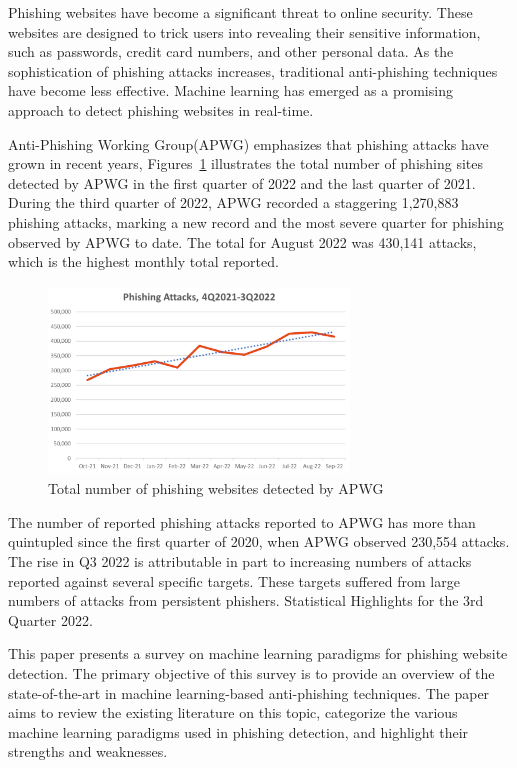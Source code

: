 \documentclass[final]{cvpr}
\begin{document}
Phishing websites have become a significant threat to online security. These websites are designed to trick users into revealing their sensitive information, such as passwords, credit card numbers, and other personal data. As the sophistication of phishing attacks increases, traditional anti-phishing techniques have become less effective. Machine learning has emerged as a promising approach to detect phishing websites in real-time.

Anti-Phishing Working Group(APWG) emphasizes that phishing attacks
have grown in recent years, Figures~\ref{fig:apwg-report} illustrates the total
number of phishing sites detected by APWG in the first quarter
of 2022 and the last quarter of 2021. During the third quarter of 2022, APWG recorded a staggering 1,270,883 phishing attacks, marking a new record and the most severe quarter for phishing observed by APWG to date. 
The total for August 2022 was 430,141 attacks,
which is the highest monthly total reported. 

\hspace*{-0.2in}
\begin{figure}[h]
   \centering
   \includegraphics[width=8cm, height=5cm]{APWG-phishing-detection-report.png}
   \caption{Total number of phishing websites detected by APWG}
   \label{fig:apwg-report}
\end{figure}

The number of reported phishing attacks reported to APWG
has more than quintupled since the first quarter of 2020, when APWG observed 230,554 attacks.
The rise in Q3 2022 is attributable in part to increasing numbers of attacks reported against several
specific targets. These targets suffered from large numbers of attacks from persistent phishers.
Statistical Highlights for the 3rd Quarter 2022.



This paper presents a survey on machine learning paradigms for phishing website detection. The primary objective of this survey is to provide an overview of the state-of-the-art in machine learning-based anti-phishing techniques. The paper aims to review the existing literature on this topic, categorize the various machine learning paradigms used in phishing detection, and highlight their strengths and weaknesses.
\end{document}
